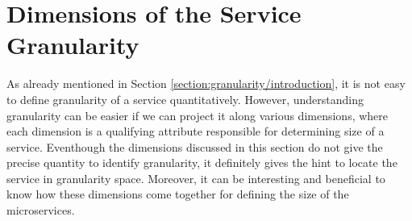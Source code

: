 \section{Dimensions of the Service Granularity}\label{section:granularity/dimensions}
As already mentioned in Section \ref{section:granularity/introduction}, it is not easy to define granularity of a service quantitatively. However, understanding granularity can be easier if we can project it along various dimensions, where each dimension is a qualifying attribute responsible for determining size of a service. Eventhough the  dimensions discussed in this section do not give the precise quantity to identify granularity, it definitely gives the hint to locate the service in granularity space. Moreover, it can be interesting and beneficial to know how these dimensions come together for defining the size of the microservices.

